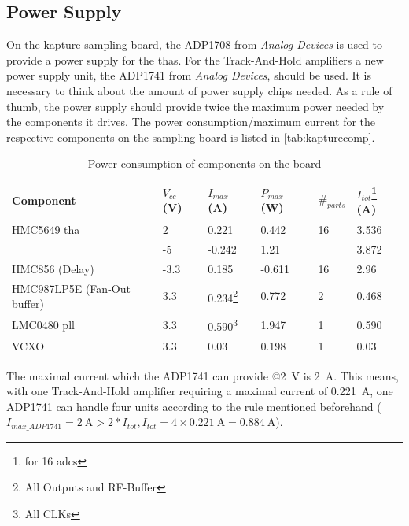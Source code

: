 \subsection{Power Supply}
On the \gls{kapture} sampling board, the ADP1708 from \textit{Analog Devices} is used to provide a power supply for the \glspl{tha}. 
For the Track-And-Hold amplifiers a new power supply unit, the ADP1741 from \textit{Analog Devices}, should be used. It is necessary to think about the amount of power supply chips needed. As a rule of thumb, the power supply should provide twice the maximum power needed by the components it drives. \cite{michele} The power consumption/maximum current for the respective components on the sampling board is listed in \autoref{tab:kapturecomp}. 
\begin{table}[tbh]
	\caption{Power consumption of components on the board}
	\label{tab:kapturecomp}
	\begin{minipage}{\textwidth}
		\centering
		\begin{tabularx}{\textwidth}{Xlllll}
			\toprule
			\textbf{Component} & $V_{cc}$ (V) & $I_{max}$ (A) & $P_{max}$ (W) & $\#_{parts}$ &  $I_{tot}$\footnote{for 16 \glspl{adc}} (A)  \\
			\midrule
			HMC5649 \gls{tha} 	& 2	  	& 0.221 	 & 0.442 & 16 & 3.536\\
			& -5  	& -0.242 & 1.21 &  & 3.872\\
			HMC856 (Delay) 			& -3.3	& 0.185 & -0.611 & 16 & 2.96\\
			HMC987LP5E (Fan-Out buffer) 	& 3.3 	& 0.234\footnote{All Outputs and RF-Buffer} & 0.772 & 2 & 0.468\\
			LMC0480 \gls{pll}			& 3.3 	& 0.590\footnote{All CLKs} & 1.947 & 1 & 0.590\\
			VCXO 					& 3.3 	& 0.03 & 0.198 & 1 & 0.03\\
			
			\bottomrule
	\end{tabularx}
	\end{minipage}
\end{table}

The maximal current which the ADP1741 can provide @\SI{2}{\volt} is \SI{2}{\ampere}. This means, with one Track-And-Hold amplifier requiring a maximal current of \SI{0.221}{\ampere}, one ADP1741 can handle four units according to the rule mentioned beforehand ($I_{max\_ADP1741} = \SI{2}{\ampere} > 2 * I_{tot}, I_{tot} = 4 \times \SI{0.221}{\ampere} =  \SI{0.884}{\ampere}$).



